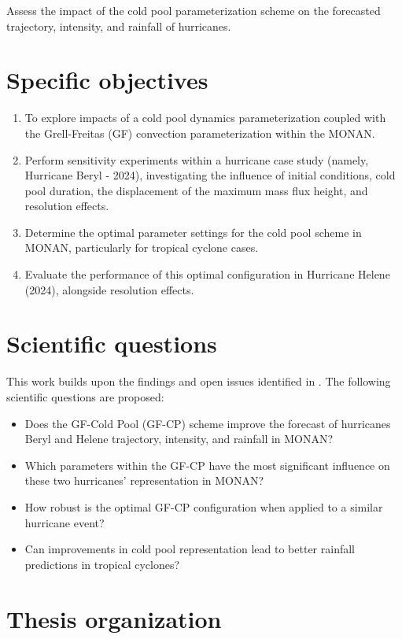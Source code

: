 Assess the impact of the cold pool parameterization scheme on the forecasted trajectory, intensity, and rainfall of hurricanes.

\section{Specific objectives}

\begin{enumerate}
    \item To explore impacts of a cold pool dynamics parameterization coupled with the Grell-Freitas (GF) convection parameterization within the MONAN.
    \item Perform sensitivity experiments within a hurricane case study (namely, Hurricane Beryl - 2024), investigating the influence of initial conditions, cold pool duration, the displacement of the maximum mass flux height, and resolution effects.
    \item Determine the optimal parameter settings for the cold pool scheme in MONAN, particularly for tropical cyclone cases.
    \item Evaluate the performance of this optimal configuration in Hurricane Helene (2024), alongside resolution effects.
\end{enumerate}

\section{Scientific questions}

This work builds upon the findings and open issues identified in . The following scientific questions are proposed:

\begin{itemize}
    \item Does the GF-Cold Pool (GF-CP) scheme improve the forecast of hurricanes Beryl and Helene trajectory, intensity, and rainfall in MONAN?
    \item Which parameters within the GF-CP have the most significant influence on these two hurricanes' representation in MONAN?
    \item How robust is the optimal GF-CP configuration when applied to a similar hurricane event?
    \item Can improvements in cold pool representation lead to better rainfall predictions in tropical cyclones?
\end{itemize}

\section{Thesis organization}

